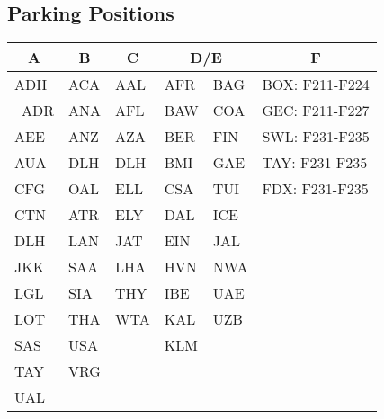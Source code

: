 \subsection{Parking Positions}

\begin{table}[h!]
\begin{tabular}{|l|l|l|ll|l|}
\hline
\multicolumn{1}{|c|}{A} & \multicolumn{1}{c|}{B} & \multicolumn{1}{c|}{C} & \multicolumn{2}{c|}{D/E}    & \multicolumn{1}{c|}{F} \\ \hline
ADH                     & ACA                    & AAL                    & AFR                   & BAG & BOX: F211-F224         \\ \
ADR                     & ANA                    & AFL                    & BAW                   & COA & GEC: F211-F227         \\
AEE                     & ANZ                    & AZA                    & BER                   & FIN & SWL: F231-F235         \\
AUA                     & DLH                    & DLH                    & BMI                   & GAE & TAY: F231-F235         \\
CFG                     & OAL                    & ELL                    & CSA                   & TUI & FDX: F231-F235         \\
CTN                     & ATR                    & ELY                    & DAL                   & ICE &                        \\
DLH                     & LAN                    & JAT                    & EIN                   & JAL &                        \\
JKK                     & SAA                    & LHA                    & HVN                   & NWA &                        \\
LGL                     & SIA                    & THY                    & IBE                   & UAE &                        \\
LOT                     & THA                    & WTA                    & KAL                   & UZB &                        \\
SAS                     & USA                    &                        & KLM                   &     &                        \\
TAY                     & VRG                    &                        &                       &     &                        \\
UAL                     &                        &                        & \multicolumn{1}{l}{} &     &                        \\ \hline
\end{tabular}
\end{table}
